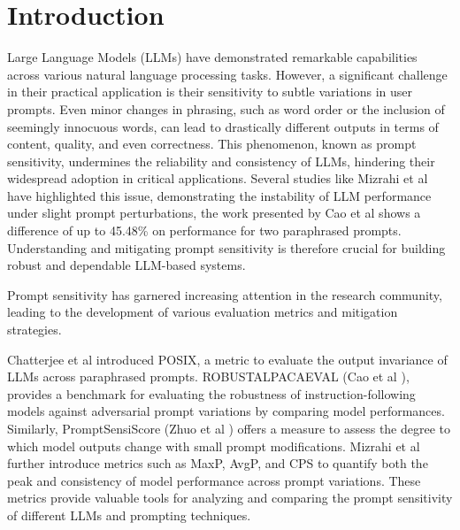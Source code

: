 \documentclass[fleqn,moreauthors,10pt]{ds_report}
\affiliation{\textit{Advisors: }}
\begin{document}
\sloppy
\flushbottom 

\maketitle 

\thispagestyle{empty} 


\section*{Introduction}
Large Language Models (LLMs) have demonstrated remarkable capabilities across various natural language processing tasks. However, a significant challenge in their practical application is their sensitivity to subtle variations in user prompts. Even minor changes in phrasing, such as word order or the inclusion of seemingly innocuous words, can lead to drastically different outputs in terms of content, quality, and even correctness. This phenomenon, known as prompt sensitivity, undermines the reliability and consistency of LLMs, hindering their widespread adoption in critical applications. Several studies like Mizrahi et al \cite{mizrahi-etal-2024-state} have highlighted this issue, demonstrating the instability of LLM performance under slight prompt perturbations, the work presented by Cao et al \cite{cao2024worstpromptperformancelarge} shows a difference of up to 45.48\% on performance for two paraphrased prompts. Understanding and mitigating prompt sensitivity is therefore crucial for building robust and dependable LLM-based systems.

Prompt sensitivity has garnered increasing attention in the research community, leading to the development of various evaluation metrics and mitigation strategies.

Chatterjee et al \cite{chatterjee-etal-2024-posix} introduced POSIX, a metric to evaluate the output invariance of LLMs across paraphrased prompts. ROBUSTALPACAEVAL (Cao et al \cite{cao2024worstpromptperformancelarge}), provides a benchmark for evaluating the robustness of instruction-following models against adversarial prompt variations by comparing model performances. Similarly, PromptSensiScore (Zhuo et al \cite{zhuo2024prosa}) offers a measure to assess the degree to which model outputs change with small prompt modifications. Mizrahi et al \cite{mizrahi-etal-2024-state} further introduce metrics such as MaxP, AvgP, and CPS to quantify both the peak and consistency of model performance across prompt variations. These metrics provide valuable tools for analyzing and comparing the prompt sensitivity of different LLMs and prompting techniques. 
\end{document}
